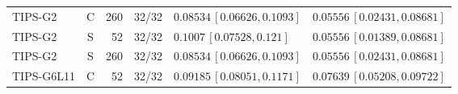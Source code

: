 \documentclass[10pt,a4paper]{article}
\begin{document}
\begin{longtable}{lcrcp{44mm}p{44mm}}
TIPS-G2 & C & 260 & 32/32 & \(0.08534\,[0.06626,0.1093]\) & \(0.05556\,[0.02431,0.08681]\)\\
TIPS-G2 & S & 52 & 32/32 & \(0.1007\,[0.07528,0.121]\) & \(0.05556\,[0.01389,0.08681]\)\\
TIPS-G2 & S & 260 & 32/32 & \(0.08534\,[0.06626,0.1093]\) & \(0.05556\,[0.02431,0.08681]\)\\
TIPS-G6L11 & C & 52 & 32/32 & \(0.09185\,[0.08051,0.1171]\) & \(0.07639\,[0.05208,0.09722]\)\\

\end{longtable}
\end{document}
